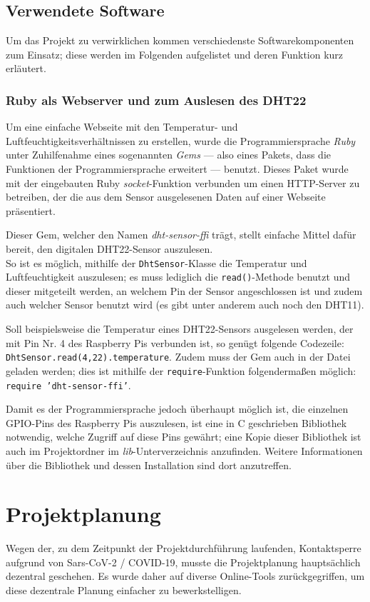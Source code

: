 \documentclass[a4paper,12pt]{article}
\begin{document}
\subsection{Verwendete Software}
Um das Projekt zu verwirklichen kommen verschiedenste Softwarekomponenten zum Einsatz; diese werden im Folgenden aufgelistet und deren Funktion kurz erläutert.

\subsubsection{Ruby als Webserver und zum Auslesen des DHT22}
Um eine einfache Webseite mit den Temperatur- und Luftfeuchtigkeitsverhältnissen zu erstellen, wurde die Programmiersprache \textit{Ruby} unter Zuhilfenahme eines sogenannten \textit{Gems} — also eines Pakets, dass die Funktionen der Programmiersprache erweitert — benutzt. Dieses Paket wurde mit der eingebauten Ruby \textit{socket}-Funktion verbunden um einen HTTP-Server zu betreiben, der die aus dem Sensor ausgelesenen Daten auf einer Webseite präsentiert.

Dieser Gem, welcher den Namen \textit{dht-sensor-ffi} trägt, stellt einfache Mittel dafür bereit, den digitalen DHT22-Sensor auszulesen.\\
So ist es möglich, mithilfe der \texttt{DhtSensor}-Klasse die Temperatur und Luftfeuchtigkeit auszulesen; es muss lediglich die \texttt{read()}-Methode benutzt und dieser mitgeteilt werden, an welchem Pin der Sensor angeschlossen ist und zudem auch welcher Sensor benutzt wird (es gibt unter anderem auch noch den DHT11). 

Soll beispielsweise die Temperatur eines DHT22-Sensors ausgelesen werden, der mit Pin Nr. 4 des Raspberry Pis verbunden ist, so genügt folgende Codezeile: \texttt{DhtSensor.read(4,22).temperature}. Zudem muss der Gem auch in der Datei geladen werden; dies ist mithilfe der \texttt{require}-Funktion folgendermaßen möglich: \texttt{require 'dht-sensor-ffi'}.

Damit es der Programmiersprache jedoch überhaupt möglich ist, die einzelnen GPIO-Pins des Raspberry Pis auszulesen, ist eine in C geschrieben Bibliothek notwendig, welche Zugriff auf diese Pins gewährt; eine Kopie dieser Bibliothek ist auch im Projektordner im \textit{lib}-Unterverzeichnis anzufinden. Weitere Informationen über die Bibliothek und dessen Installation sind dort anzutreffen.

\pagebreak
\section{Projektplanung}
Wegen der, zu dem Zeitpunkt der Projektdurchführung laufenden, Kontaktsperre aufgrund von Sars-CoV-2 / COVID-19, musste die Projektplanung hauptsächlich dezentral geschehen.
Es wurde daher auf diverse Online-Tools zurückgegriffen, um diese dezentrale Planung einfacher zu bewerkstelligen.
\end{document}
